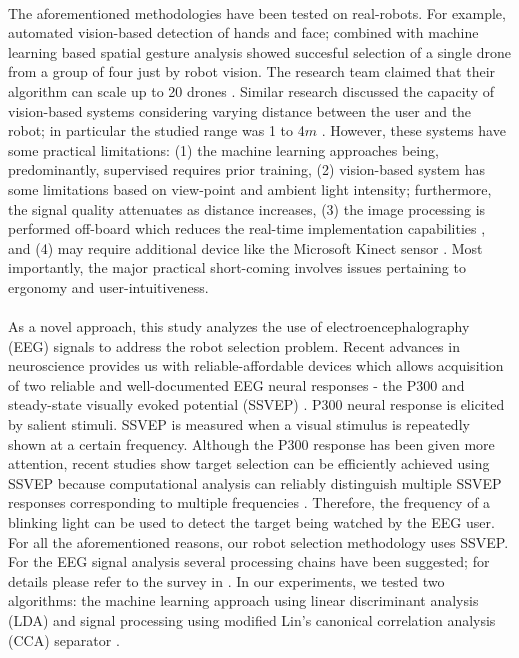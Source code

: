 \documentclass{svmult}
\begin{document}
\\
The aforementioned methodologies have been tested on real-robots. For example, automated vision-based detection of hands and face; combined with machine learning based spatial gesture analysis showed succesful selection of a single drone from a group of four just by robot vision. 
The research team claimed that their algorithm can scale up to 20 drones \cite{Nagietal2014}. Similar research discussed the capacity of vision-based systems considering varying distance between the user and the robot; in particular the studied range was 1 to 4$m$ \cite{Couture-Beil2010}. 
However, these systems have some practical limitations: (1) the machine learning approaches being, predominantly, supervised requires prior training, (2) vision-based system has some limitations based on view-point and ambient light intensity; furthermore, the signal quality attenuates as distance increases, (3) the image processing is performed off-board which reduces the real-time implementation capabilities \cite{Monajjemi2013, Pourmehr2013}, and (4) may require additional device like the Microsoft Kinect sensor \cite{ alonso2015gesture, pourmehr2013robust}. 
Most importantly, the major practical short-coming involves issues pertaining to ergonomy and user-intuitiveness.\\
\\ 
As a novel approach, this study analyzes the use of electroencephalography (EEG) signals to address the robot selection problem. Recent advances in neuroscience provides us with reliable-affordable devices which allows acquisition of two reliable and well-documented EEG neural responses - the P300 and steady-state visually evoked potential (SSVEP) \cite{Beverina2003, Bi2013, Zhu2010}. 
P300 neural response is elicited by salient stimuli. SSVEP is measured when a visual stimulus is repeatedly shown at a certain frequency. Although the P300 response has been given more attention, recent studies show target selection can be efficiently achieved using SSVEP because computational analysis can reliably distinguish multiple SSVEP responses corresponding to multiple frequencies \cite{SSVEPfiability}. Therefore, the frequency of a blinking light can be used to detect the target being watched by the EEG user. 
For all the aforementioned reasons, our robot selection methodology uses SSVEP. For the EEG signal analysis several processing chains have been suggested; for details please refer to the survey in \cite{Bi2013}. In our experiments, we tested two algorithms: the machine learning approach using linear discriminant analysis (LDA) \cite{openvibeSSVEP} and signal processing using modified Lin's canonical correlation analysis (CCA) separator \cite{Lin2014}. 
\end{document}
